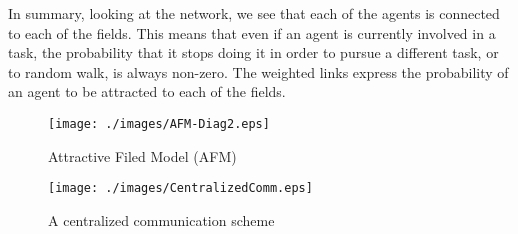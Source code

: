 In summary, looking at the network, we see that each of the agents is connected to each of the fields. This means that even if an agent is currently involved in a task, the probability that it stops doing it in order to pursue a different task, or to random walk, is always non-zero.  The weighted links express the probability of an agent to be attracted to each of the fields.
\begin{figure}
\begin{minipage}[t]{0.48\linewidth}
\centering
\texttt{[image: ./images/AFM-Diag2.eps]}
\caption{\small Attractive Filed Model (AFM)}
\label{fig:afm} %
\end{minipage}
\hspace{0.5cm}
\begin{minipage}[t]{0.48\linewidth}
\centering
\texttt{[image: ./images/CentralizedComm.eps]}
\caption{\small A centralized communication scheme} %
\label{fig:ccm} %
\end{minipage}
\end{figure}
